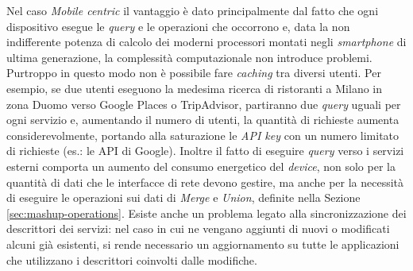 Nel caso \emph{Mobile centric} il vantaggio è dato principalmente dal fatto che ogni dispositivo esegue le \emph{query} e le operazioni che occorrono e, data la non indifferente potenza di calcolo dei moderni processori montati negli \emph{smartphone} di ultima generazione, la complessità computazionale non introduce problemi.
Purtroppo in questo modo non è possibile fare \emph{caching} tra diversi utenti. Per esempio, se due utenti eseguono la medesima ricerca di ristoranti a Milano in zona Duomo verso Google Places o TripAdvisor, partiranno due \emph{query} uguali per ogni servizio e, aumentando il numero di utenti, la quantità di richieste aumenta considerevolmente, portando alla saturazione le \emph{API key} con un numero limitato di richieste (es.: le API di Google). Inoltre il fatto di eseguire \emph{query} verso i servizi esterni comporta un aumento del consumo energetico del \emph{device}, non solo per la quantità di dati che le interfacce di rete devono gestire, ma anche per la necessità di eseguire le operazioni sui dati di \emph{Merge} e \emph{Union}, definite nella Sezione \ref{sec:mashup-operations}. 
Esiste anche un problema legato alla sincronizzazione dei descrittori dei servizi: nel caso in cui ne vengano aggiunti di nuovi o modificati alcuni già esistenti, si rende necessario un aggiornamento su tutte le applicazioni che utilizzano i descrittori coinvolti dalle modifiche.

